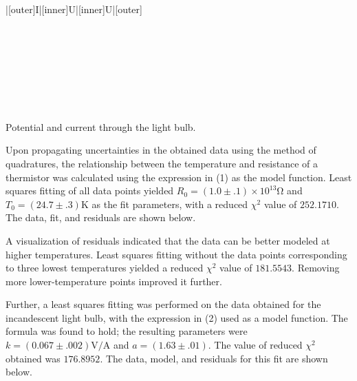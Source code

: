 \begin{paper}
{\begin{papertable}{|[outer]I|[inner]U|[inner]U|[outer]}
			\papertableindex{}\\\paperiline
			\papertableindex{}\\\paperiline
			\papertableindex{}\\\paperiline
			\papertableindex{}\\\paperiline
			\papertableindex{}\\\paperiline
			\papertableindex{}\\\paperiline
			\papertableindex{}\\\paperiline
			\papertableindex{}\\\paperoline
			\end{papertable}\vspace{-1.5em}}
	{Potential and current through the light bulb.} 

	
	Upon propagating uncertainties in the obtained data using the method of quadratures, the relationship between the temperature and resistance of a thermistor was calculated using the expression in (1) as the model function. Least squares fitting of all data points yielded \( R_0 = (1.0 \pm .1) \times 10^{13} \si{\ohm} \) and \( T_0 = (24.7 \pm .3) \si{\kelvin} \) as the fit parameters, with a reduced \( \chi ^ 2 \) value of \( 252.1710 \). The data, fit, and residuals are shown below.
	
	A visualization of residuals  indicated that the data can be better modeled at higher temperatures. Least squares fitting without the data points corresponding to three lowest temperatures yielded a reduced \( \chi ^ 2 \) value of \( 181.5543 \). Removing more lower-temperature points improved it further. 
	
	
	Further, a least squares fitting was performed on the data obtained for the incandescent light bulb, with the expression in (2) used as a model function. The formula was found to hold; the resulting parameters were \( k =  (0.067 \pm .002) \si{\volt\per\ampere} \) and \( a = (1.63 \pm .01) \). The value of reduced \( \chi ^ 2 \) obtained was \( 176.8952 \). The data, model, and residuals for this fit are shown below.


\end{paper}
